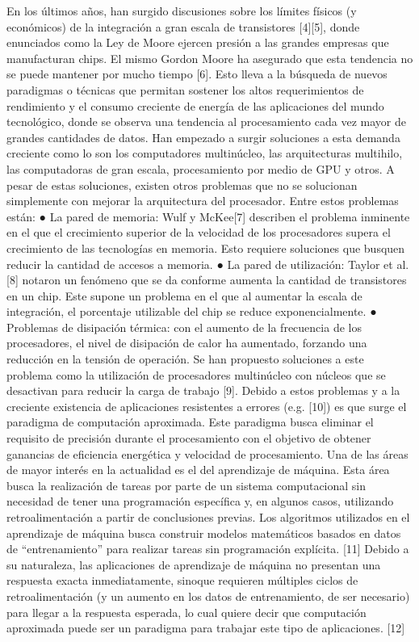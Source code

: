 En los últimos años, han surgido discusiones sobre los límites físicos (y económicos) de la integración a
gran escala de transistores [4][5], donde enunciados como la Ley de Moore ejercen presión a las grandes
empresas que manufacturan chips. El mismo Gordon Moore ha asegurado que esta tendencia no se
puede mantener por mucho tiempo [6]. Esto lleva a la búsqueda de nuevos paradigmas o técnicas que
permitan sostener los altos requerimientos de rendimiento y el consumo creciente de energía de las
aplicaciones del mundo tecnológico, donde se observa una tendencia al procesamiento cada vez mayor
de grandes cantidades de datos. Han empezado a surgir soluciones a esta demanda creciente como lo
son los computadores multinúcleo, las arquitecturas multihilo, las computadoras de gran escala,
procesamiento por medio de GPU y otros.
A pesar de estas soluciones, existen otros problemas que no se solucionan simplemente con mejorar la
arquitectura del procesador. Entre estos problemas están:
● La pared de memoria: Wulf y McKee[7] describen el problema inminente en el que el
crecimiento superior de la velocidad de los procesadores supera el crecimiento de las
tecnologías en memoria. Esto requiere soluciones que busquen reducir la cantidad de accesos a
memoria.
● La pared de utilización: Taylor et al.[8] notaron un fenómeno que se da conforme aumenta la
cantidad de transistores en un chip. Este supone un problema en el que al aumentar la escala de
integración, el porcentaje utilizable del chip se reduce exponencialmente.
● Problemas de disipación térmica: con el aumento de la frecuencia de los procesadores, el nivel
de disipación de calor ha aumentado, forzando una reducción en la tensión de operación. Se han
propuesto soluciones a este problema como la utilización de procesadores multinúcleo con
núcleos que se desactivan para reducir la carga de trabajo [9].
Debido a estos problemas y a la creciente existencia de aplicaciones resistentes a errores (e.g. [10]) es
que surge el paradigma de computación aproximada. Este paradigma busca eliminar el requisito de
precisión durante el procesamiento con el objetivo de obtener ganancias de eficiencia energética y
velocidad de procesamiento.
Una de las áreas de mayor interés en la actualidad es el del aprendizaje de máquina. Esta área busca la
realización de tareas por parte de un sistema computacional sin necesidad de tener una programación
específica y, en algunos casos, utilizando retroalimentación a partir de conclusiones previas. Los
algoritmos utilizados en el aprendizaje de máquina busca construir modelos matemáticos basados en
datos de “entrenamiento” para realizar tareas sin programación explícita. [11] Debido a su naturaleza,
las aplicaciones de aprendizaje de máquina no presentan una respuesta exacta inmediatamente, sinoque requieren múltiples ciclos de retroalimentación (y un aumento en los datos de entrenamiento, de
ser necesario) para llegar a la respuesta esperada, lo cual quiere decir que computación aproximada
puede ser un paradigma para trabajar este tipo de aplicaciones. [12]

